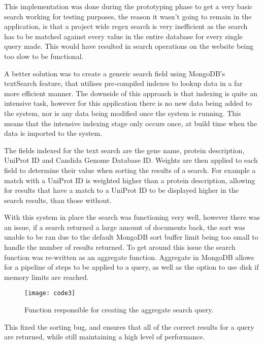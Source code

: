 This implementation was done during the prototyping phase to get a very basic search working for testing purposes, the reason it wasn't going to remain in the application, is that a project wide regex search is very inefficient as the search has to be matched against every value in the entire database for every single query made. This would have resulted in search operations on the website being too slow to be functional.

A better solution was to create a generic search field using MongoDB's textSearch\cite{textsearch} feature, that utilises pre-compiled indexes to lookup data in a far more efficient manner. The downside of this approach is that indexing is quite an intensive task, however for this application there is no new data being added to the system, nor is any data being modified once the system is running. This means that the intensive indexing stage only occurs once, at build time when the data is imported to the system.

The fields indexed for the text search are the gene name, protein description, UniProt ID and Candida Genome Database ID. Weights are then applied to each field to determine their value when sorting the results of a search. For example a match with a UniProt ID is weighted higher than a protein description, allowing for results that have a match to a UniProt ID to be displayed higher in the search results, than those without.

With this system in place the search was functioning very well, however there was an issue, if a search returned a large amount of documents back, the sort was unable to be ran due to the default MongoDB sort buffer limit being too small to handle the number of results returned. To get around this issue the search function was re-written as an aggregate function. Aggregate\cite{aggregate} in MongoDB allows for a pipeline of steps to be applied to a query, as well as the option to use disk if memory limits are reached. 

\begin{figure}[H]
\begin{center}
\texttt{[image: code3]}
\caption{Function responsible for creating the aggregate search query. \label{overflow}}
\end{center}
\end{figure}

This fixed the sorting bug, and ensures that all of the correct results for a query are returned, while still maintaining a high level of performance. 


